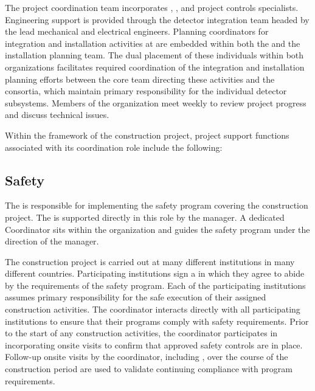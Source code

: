 The  project coordination team incorporates , 
, and project controls specialists.  Engineering support 
is provided through the  detector integration team 
headed by the lead  mechanical and electrical engineers.
Planning coordinators for integration and installation activities 
at  are embedded within both the  and the 
 installation planning team.  The dual placement of 
these individuals within both organizations facilitates required 
coordination of the integration and installation planning 
efforts between the core team directing these activities and the 
 consortia, which maintain primary responsibility for 
the individual detector subsystems.  Members of the  
organization meet weekly to review project progress and discuss 
technical issues. 
     
Within the framework of the   construction 
project,  project support functions associated with its 
coordination role include the following:

\subsection{Safety}

The  is responsible for implementing the safety program
covering the  construction project.  The 
is supported directly in this role by the  
manager.  A dedicated   Coordinator sits within
the  organization and guides the  safety program 
under the direction of the   manager.

The  construction project is carried out at many different
institutions in many different countries.  Participating institutions
sign a  in which they agree to abide
by the requirements of the  safety program.  Each of the
participating institutions assumes primary responsibility for the safe
execution of their assigned construction activities.  The 
 coordinator interacts directly with all participating
institutions to ensure that their programs comply with 
safety requirements.  Prior to the start of any construction 
activities, the   coordinator participates in 
 incorporating onsite visits to confirm 
that approved safety controls are in place.  Follow-up onsite visits 
by the   coordinator, including , over the course of the 
construction period are used to validate continuing compliance with
program requirements.


